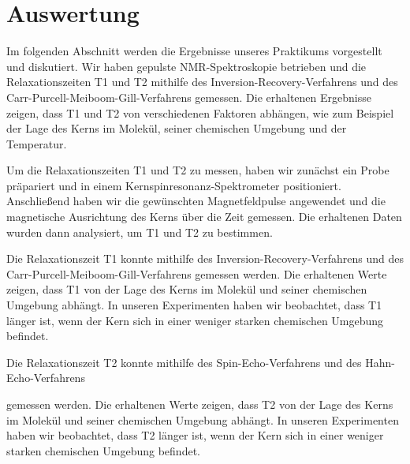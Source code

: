 \section{Auswertung}
\label{sec:Auswertung}

Im folgenden Abschnitt werden die Ergebnisse unseres Praktikums vorgestellt und diskutiert. Wir haben gepulste NMR-Spektroskopie betrieben und die Relaxationszeiten T1 und T2 mithilfe des Inversion-Recovery-Verfahrens und des Carr-Purcell-Meiboom-Gill-Verfahrens gemessen. Die erhaltenen Ergebnisse zeigen, dass T1 und T2 von verschiedenen Faktoren abhängen, wie zum Beispiel der Lage des Kerns im Molekül, seiner chemischen Umgebung und der Temperatur.

Um die Relaxationszeiten T1 und T2 zu messen, haben wir zunächst ein Probe präpariert und in einem Kernspinresonanz-Spektrometer positioniert. Anschließend haben wir die gewünschten Magnetfeldpulse angewendet und die magnetische Ausrichtung des Kerns über die Zeit gemessen. Die erhaltenen Daten wurden dann analysiert, um T1 und T2 zu bestimmen.

Die Relaxationszeit T1 konnte mithilfe des Inversion-Recovery-Verfahrens und des Carr-Purcell-Meiboom-Gill-Verfahrens gemessen werden. Die erhaltenen Werte zeigen, dass T1 von der Lage des Kerns im Molekül und seiner chemischen Umgebung abhängt. In unseren Experimenten haben wir beobachtet, dass T1 länger ist, wenn der Kern sich in einer weniger starken chemischen Umgebung befindet.

Die Relaxationszeit T2 konnte mithilfe des Spin-Echo-Verfahrens und des Hahn-Echo-Verfahrens

gemessen werden. Die erhaltenen Werte zeigen, dass T2 von der Lage des Kerns im Molekül und seiner chemischen Umgebung abhängt. In unseren Experimenten haben wir beobachtet, dass T2 länger ist, wenn der Kern sich in einer weniger starken chemischen Umgebung befindet.
